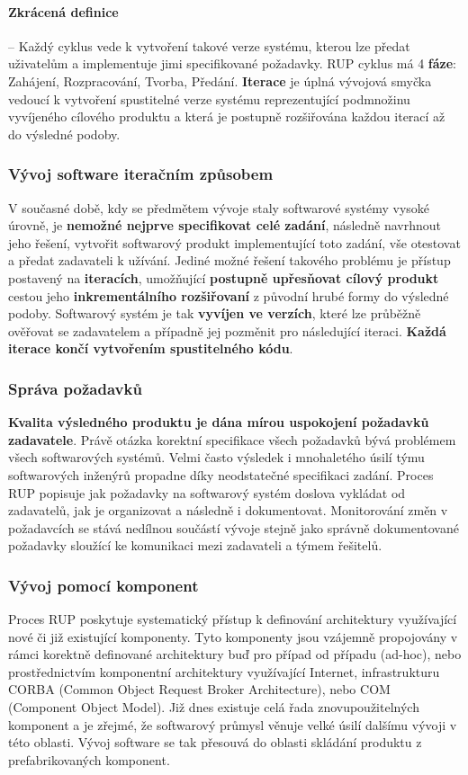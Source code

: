 \paragraph*{Zkrácená definice} -- Každý cyklus vede k vytvoření takové verze systému, kterou lze předat uživatelům a implementuje jimi specifikované požadavky. RUP cyklus má 4 \textbf{fáze}: Zahájení, Rozpracování, Tvorba, Předání. \textbf{Iterace} je úplná vývojová smyčka vedoucí k vytvoření spustitelné verze systému reprezentující podmnožinu vyvíjeného cílového produktu a která je postupně rozšiřována každou iterací až do výsledné podoby.

\subsubsection{Vývoj software iteračním způsobem}
V současné době, kdy se předmětem vývoje staly softwarové systémy vysoké úrovně, je \textbf{nemožné nejprve specifikovat celé zadání}, následně navrhnout jeho řešení, vytvořit softwarový produkt implementující toto zadání, vše otestovat a předat zadavateli k užívání. Jediné možné řešení takového problému je přístup postavený na \textbf{iteracích}, umožňující \textbf{postupně upřesňovat cílový produkt} cestou jeho \textbf{inkrementálního rozšiřovaní} z původní hrubé formy do výsledné podoby.  Softwarový systém je tak \textbf{vyvíjen ve verzích}, které lze průběžně ověřovat se zadavatelem a případně jej pozměnit pro následující iteraci. \textbf{Každá iterace končí vytvořením spustitelného kódu}.

\subsubsection{Správa požadavků}
\textbf{Kvalita výsledného produktu je dána mírou uspokojení požadavků zadavatele}. Právě otázka korektní specifikace všech požadavků bývá problémem všech softwarových systémů. Velmi často výsledek i mnohaletého úsilí týmu softwarových inženýrů propadne díky neodstatečné specifikaci zadání. Proces RUP popisuje jak požadavky na softwarový systém doslova vykládat od zadavatelů, jak je organizovat a následně i dokumentovat. Monitorování změn v požadavcích se stává nedílnou součástí vývoje stejně jako správně dokumentované požadavky sloužící ke komunikaci mezi zadavateli a týmem řešitelů.

\subsubsection{Vývoj pomocí komponent}
Proces RUP poskytuje systematický přístup k definování architektury využívající nové či již existující komponenty. Tyto komponenty jsou vzájemně propojovány v rámci korektně definované architektury buď pro případ od případu (ad-hoc), nebo prostřednictvím komponentní architektury využívající Internet, infrastrukturu CORBA (Common Object Request Broker Architecture), nebo COM (Component Object Model). Již dnes existuje celá řada znovupoužitelných komponent a je zřejmé, že softwarový průmysl věnuje velké úsilí dalšímu vývoji v této oblasti. Vývoj software se tak přesouvá do oblasti skládání produktu z prefabrikovaných komponent.

